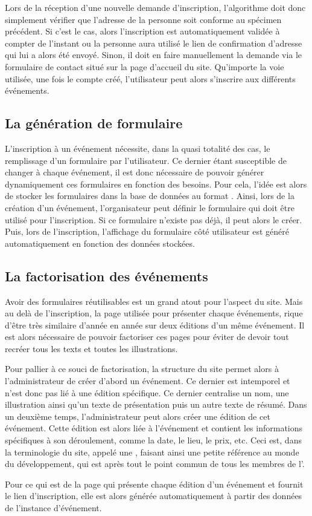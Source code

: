 Lors de la réception d'une nouvelle demande d'inscription, l'algorithme doit donc simplement vérifier que l'adresse  de la personne soit conforme au spécimen précédent. Si c'est le cas, alors l'inscription est automatiquement validée à compter de l'instant ou la personne aura utilisé le lien de confirmation d'adresse qui lui a alors été envoyé. Sinon, il doit en faire manuellement la demande via le formulaire de contact situé sur la page d'accueil du site. Qu'importe la voie utilisée, une fois le compte créé, l'utilisateur peut alors s'inscrire aux différents événements.

\subsection{La génération de formulaire}
\label{subsec:generation-formulaire}

L'inscription à un événement nécessite, dans la quasi totalité des cas, le remplissage d'un formulaire par l'utilisateur. Ce dernier étant susceptible de changer à chaque événement, il est donc nécessaire de pouvoir générer dynamiquement ces formulaires en fonction des besoins. Pour cela, l'idée est alors de stocker les formulaires dans la base de données au format . Ainsi, lors de la création d'un événement, l'organisateur peut définir le formulaire qui doit être utilisé pour l'inscription. Si ce formulaire n'existe pas déjà, il peut alors le créer. Puis, lors de l'inscription, l'affichage du formulaire côté utilisateur est généré automatiquement en fonction des données stockées.

\subsection{La factorisation des événements}
\label{subsec:factorisation-evenements}

Avoir des formulaires réutilisables est un grand atout pour l'aspect  du site. Mais au delà de l'inscription, la page utilisée pour présenter chaque événements, rique d'être très similaire d'année en année sur deux éditions d'un même événement. Il est alors nécessaire de pouvoir factoriser ces pages pour éviter de devoir tout recréer tous les texts et toutes les illustrations.
\bigskip

Pour pallier à ce souci de factorisation, la structure du site permet alors à l'administrateur de créer d'abord un événement. Ce dernier est intemporel et n'est donc pas lié à une édition spécifique. Ce dernier centralise un nom, une illustration ainsi qu'un texte de présentation puis un autre texte de résumé. Dans un deuxième temps, l'administrateur peut alors créer une édition de cet événement. Cette édition est alors liée à l'événement et contient les informations spécifiques à son déroulement, comme la date, le lieu, le prix, etc. Ceci est, dans la terminologie du site, appelé une , faisant ainsi une petite référence au monde du développement, qui est après tout le point commun de tous les membres de l'\ofni.

Pour ce qui est de la page qui présente chaque édition d'un événement et fournit le lien d'inscription, elle est alors générée automatiquement à partir des données de l'instance d'événement.


